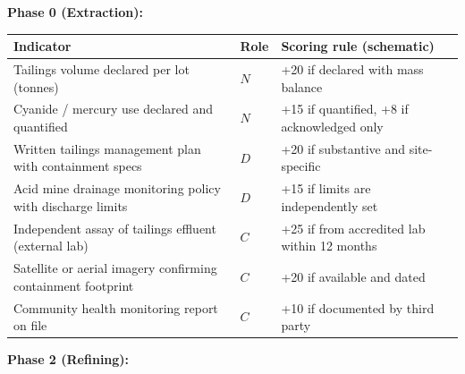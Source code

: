 \documentclass[
  11pt,
  letterpaper,
]{article}
\begin{document}
\textbf{Phase 0 (Extraction):}

\begin{longtable}[]{@{}
  >{\raggedright\arraybackslash}p{}
  >{\raggedright\arraybackslash}p{}
  >{\raggedright\arraybackslash}p{}@{}}
\toprule\noalign{}
\begin{minipage}[b]{\linewidth}\raggedright
Indicator
\end{minipage} & \begin{minipage}[b]{\linewidth}\raggedright
Role
\end{minipage} & \begin{minipage}[b]{\linewidth}\raggedright
Scoring rule (schematic)
\end{minipage} \\
\midrule\noalign{}
\endhead
\bottomrule\noalign{}
\endlastfoot
Tailings volume declared per lot (tonnes) & \(N\) & +20 if declared with
mass balance \\
Cyanide / mercury use declared and quantified & \(N\) & +15 if
quantified, +8 if acknowledged only \\
Written tailings management plan with containment specs & \(D\) & +20 if
substantive and site-specific \\
Acid mine drainage monitoring policy with discharge limits & \(D\) & +15
if limits are independently set \\
Independent assay of tailings effluent (external lab) & \(C\) & +25 if
from accredited lab within 12 months \\
Satellite or aerial imagery confirming containment footprint & \(C\) &
+20 if available and dated \\
Community health monitoring report on file & \(C\) & +10 if documented
by third party \\
\end{longtable}

\textbf{Phase 2 (Refining):}
\end{document}
